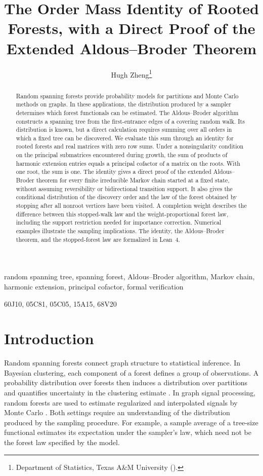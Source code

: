 \documentclass[onefignum,onetabnum,nohypdvips]{siamart250211}
\title{The Order Mass Identity of Rooted Forests, with a Direct Proof of the Extended Aldous--Broder Theorem}
\author{Hugh Zheng\thanks{Department of Statistics, Texas A\&M University (\email{hugh.zheng@tamu.edu}).}}
\numberwithin{theorem}{section}
\numberwithin{equation}{section}
\begin{document}
\maketitle

\begin{abstract}
Random spanning forests provide probability models for partitions and
Monte Carlo methods on graphs. In these applications, the distribution
produced by a sampler determines which forest functionals can be
estimated. The Aldous--Broder algorithm constructs a spanning tree from
the first-entrance edges of a covering random walk. Its distribution is
known, but a direct calculation requires summing over all orders in
which a fixed tree can be discovered. We evaluate this sum through an
identity for rooted forests and real matrices with zero row sums.
Under a nonsingularity condition on the principal submatrices
encountered during growth, the sum of products of harmonic extension
entries equals a principal cofactor of a matrix on the roots. With one
root, the sum is one. The identity gives a direct proof of the
extended Aldous--Broder theorem for every finite
irreducible Markov chain started at a fixed state, without assuming
reversibility or bidirectional transition support. It also gives the
conditional distribution of the discovery order and the law
of the forest obtained by stopping after all nonroot vertices have
been visited. A completion weight describes the difference between
this stopped-walk law and the weight-proportional forest law, including
the support restriction needed for importance correction. Numerical
examples illustrate the sampling implications. The identity, the
Aldous--Broder theorem, and the stopped-forest law are formalized in
Lean~4.
\end{abstract}

\begin{keywords}
random spanning tree, spanning forest, Aldous--Broder algorithm,
Markov chain, harmonic extension, principal cofactor, formal
verification
\end{keywords}

\begin{MSCcodes}
60J10, 05C81, 05C05, 15A15, 68V20
\end{MSCcodes}

\section{Introduction}\label{sec:intro}

Random spanning forests connect graph structure to statistical
inference. In Bayesian clustering, each component of a forest defines
a group of observations. A probability distribution over forests then
induces a distribution over partitions and quantifies uncertainty in
the clustering estimate \cite{LuoSangMallick2021,DuanRoy2024}. In graph
signal processing, random forests are used to estimate regularized and
interpolated signals by Monte Carlo
\cite{PilavciAmblardBarthelmeTremblay2021}. Both settings require an
understanding of the distribution produced by the sampling procedure.
For example, a sample average of a tree-size functional estimates its
expectation under the sampler's law, which need not be the forest law
specified by the model.
\end{document}
